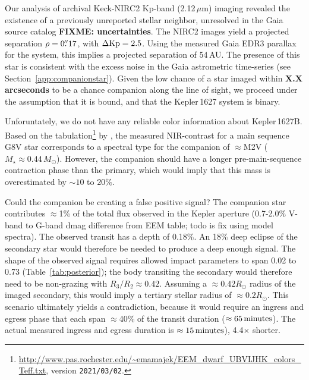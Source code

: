 \documentclass[12pt,modern,tighten]{aastex63}
\begin{document}
Our analysis of archival Keck-NIRC2 Kp-band (2.12\,$\mu $m) imaging
revealed the existence of a previously unreported stellar neighbor,
unresolved in the Gaia source catalog {\bf FIXME: uncertainties}.  The
NIRC2 images yield a projected separation $\rho=0\mbox{$.\!\!^{\prime\prime}$}17$, with
$\Delta {\rm Kp} = 2.5$.  Using the measured Gaia EDR3 parallax for
the system, this implies a projected separation of 54\,AU.  The
presence of this star is consistent with the excess noise in the Gaia
astrometric time-series (see Section~\ref{app:companionstar}).  Given
the low chance of a star imaged within {\bf X.X arcseconds} to be a
chance companion along the line of sight, we proceed under the
assumption that it is bound, and that the Kepler\,1627 system is
binary.

Unforuntately, we do not have any reliable color information about
Kepler\,1627B.  Based on the
tabulation\footnote{\url{http://www.pas.rochester.edu/~emamajek/EEM_dwarf_UBVIJHK_colors_Teff.txt},
version \texttt{2021/03/02}.} by \citet{pecaut_mamajek_2013}, the
measured NIR-contrast for a main sequence G8V star corresponds to a
spectral type for the companion of $\approx$M2V ($M_\star \approx
0.44\,M_\odot$).  However, the companion should have a longer
pre-main-sequence contraction phase than the primary, which would
imply that this mass is overestimated by $\sim10$ to $20\%$.

Could the companion be creating a false positive signal?  The
companion star contributes $\approx$1\% of the total flux observed in
the Kepler aperture (0.7-2.0\% V-band to G-band dmag difference from
EEM table; todo is fix using model spectra).  The observed transit has
a depth of 0.18\%.  An 18\% deep eclipse of the secondary star would
therefore be needed to produce a deep enough signal.  The shape of the
observed signal requires allowed impact parameters to span 0.02 to
0.73 (Table~\ref{tab:posterior}); the body transiting the secondary
would therefore need to be non-grazing with $R_3/R_2 \approx 0.42$.
Assuming a $\approx 0.42R_\odot$ radius of the imaged secondary, this
would imply a tertiary stellar radius of $\approx 0.2R_\odot$.  This
scenario ultimately yields a contradiction, because it would require
an ingress and egress phase that each span $\approx$40\% of the
transit duration ($\approx 65\,{\rm minutes}$).  The actual measured
ingress and egress duration is $\approx 15\,{\rm minutes}$),
4.4$\times$ shorter.
\end{document}
